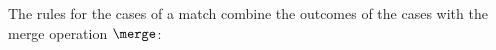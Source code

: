 The rules for the cases of a match combine the outcomes of the cases with the merge operation $\merge$:
\begin{mathpar}

\end{mathpar}
